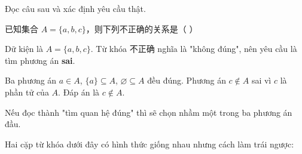 \documentclass[11pt, a4paper]{article}
\begin{document}
\begin{vidu}[{6}]
Đọc câu sau và xác định yêu cầu thật.

已知集合 $A=\{a,b,c\}$，则下列不正确的关系是（ ）

Dữ kiện là $A = \{a, b, c\}$. Từ khóa 不正确 nghĩa là "không đúng", nên yêu cầu là tìm phương án \textbf{sai}.

Ba phương án $a \in A$, $\{a\} \subseteq A$, $\varnothing \subseteq A$ đều đúng. Phương án $c \notin A$ sai vì $c$ là phần tử của $A$. Đáp án là $c \notin A$.

Nếu đọc thành "tìm quan hệ đúng" thì sẽ chọn nhầm một trong ba phương án đầu.

\begin{dinhly}
Hai cặp từ khóa dưới đây có hình thức giống nhau nhưng cách làm trái ngược:

\end{dinhly}
\end{vidu}
\end{document}
